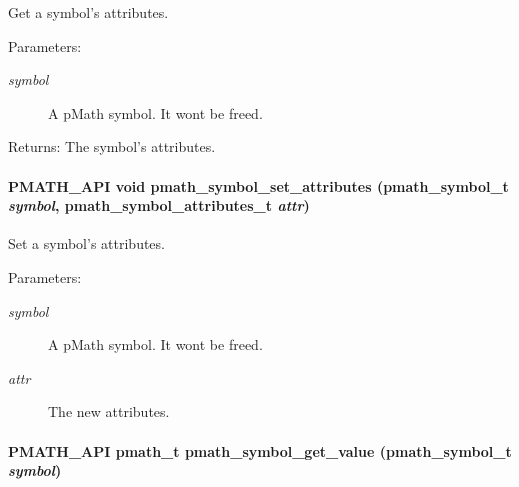 Get a symbol's attributes. 

\begin{Desc}
\item[Parameters:]
\begin{description}
\item[{\em symbol}]A pMath symbol. It wont be freed. \end{description}
\end{Desc}
\begin{Desc}
\item[Returns:]The symbol's attributes. \end{Desc}
\hypertarget{group__symbols_g37c740a2074440f4364763a4dbfab931}{
\paragraph[{pmath\_\-symbol\_\-set\_\-attributes}]{\setlength{\rightskip}{0pt plus 5cm}PMATH\_\-API void pmath\_\-symbol\_\-set\_\-attributes ({\bf pmath\_\-symbol\_\-t} {\em symbol}, \/  {\bf pmath\_\-symbol\_\-attributes\_\-t} {\em attr})}\hfill}
\label{group__symbols_g37c740a2074440f4364763a4dbfab931}


Set a symbol's attributes. 

\begin{Desc}
\item[Parameters:]
\begin{description}
\item[{\em symbol}]A pMath symbol. It wont be freed. \item[{\em attr}]The new attributes. \end{description}
\end{Desc}
\hypertarget{group__symbols_gbf330376870422d219ae9f0557e515c2}{
\paragraph[{pmath\_\-symbol\_\-get\_\-value}]{\setlength{\rightskip}{0pt plus 5cm}PMATH\_\-API {\bf pmath\_\-t} pmath\_\-symbol\_\-get\_\-value ({\bf pmath\_\-symbol\_\-t} {\em symbol})}\hfill}
\label{group__symbols_gbf330376870422d219ae9f0557e515c2}


